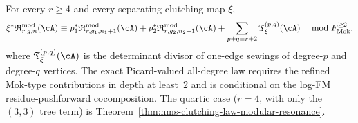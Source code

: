 \begin{theorem}
\label{thm:nms-all-degree-resonance-boundary}%
For every $r\ge 4$ and every separating clutching map $\xi$,
\begin{equation}
\label{eq:nms-all-degree-resonance-boundary}
\xi^*\mathfrak R^{\mathrm{mod}}_{r,g,n}(\cA)
\equiv
p_1^*\mathfrak R^{\mathrm{mod}}_{r,g_1,n_1+1}(\cA)
+
p_2^*\mathfrak R^{\mathrm{mod}}_{r,g_2,n_2+1}(\cA)
+
\sum_{p+q=r+2}\mathfrak T^{(p,q)}_{\xi}(\cA)
\quad \bmod F_{\mathrm{Mok}}^{\ge 2},
\end{equation}
where $\mathfrak T^{(p,q)}_{\xi}(\cA)$ is the determinant divisor of
one-edge sewings of degree-$p$ and degree-$q$ vertices. The exact
Picard-valued all-degree law requires the refined Mok-type
contributions in depth at least~$2$ and is conditional on the
log-FM residue-pushforward cocomposition. The quartic case ($r=4$, with
only the $(3,3)$ tree term) is
Theorem~\ref{thm:nms-clutching-law-modular-resonance}.
\end{theorem}

